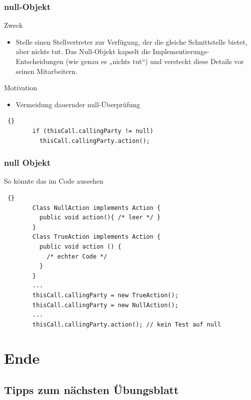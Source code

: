 \begin{frame}[fragile]
\frametitle {null-Objekt}
\begin{block} {Zweck}
	\begin{itemize}
		\item Stelle einen Stellvertreter zur Verfügung, der die gleiche
			Schnittstelle bietet, aber nichts tut. Das Null-Objekt kapselt die
			Implementierungs-Entscheidungen (wie genau es „nichts tut“) und
			versteckt diese Details vor seinen Mitarbeitern.
	\end{itemize}
\end{block}

\begin{block} {Motivation}
	\begin{itemize}
		\item Vermeidung dauernder null-Überprüfung
	\end{itemize}
	\begin{lstlisting} {}
		if (thisCall.callingParty != null)
		  thisCall.callingParty.action();
	\end{lstlisting}
\end{block}

\end{frame}


\begin{frame}[fragile]
\frametitle{null Objekt}
	\begin{block}{So könnte das im Code aussehen} 
	\begin{lstlisting} {}
		Class NullAction implements Action {
		  public void action(){ /* leer */ }
		}
		Class TrueAction implements Action {
		  public void action () {
		    /* echter Code */
		  }
		}
		...
		thisCall.callingParty = new TrueAction();
		thisCall.callingParty = new NullAction();
		...
		thisCall.callingParty.action(); // kein Test auf null
	\end{lstlisting}
	\end{block}
\end{frame}



\section{Ende}
\subsection{Tipps zum nächsten Übungsblatt}

